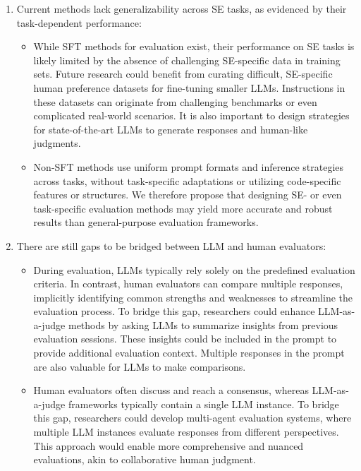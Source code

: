 \begin{enumerate}

    \item Current methods lack generalizability across SE tasks, as evidenced by their task-dependent performance:
    
    \begin{itemize}
    
        \item While SFT methods for evaluation exist, their performance on SE tasks is likely limited by the absence of challenging SE-specific data in training sets. Future research could benefit from curating difficult, SE-specific human preference datasets for fine-tuning smaller LLMs. Instructions in these datasets can originate from challenging benchmarks or even complicated real-world scenarios. It is also important to design strategies for state-of-the-art LLMs to generate responses and human-like judgments.

        \item Non-SFT methods use uniform prompt formats and inference strategies across tasks, without task-specific adaptations or utilizing code-specific features or structures. We therefore propose that designing SE- or even task-specific evaluation methods may yield more accurate and robust results than general-purpose evaluation frameworks.
        
    \end{itemize}

    \item There are still gaps to be bridged between LLM and human evaluators:

    \begin{itemize}
    
        \item During evaluation, LLMs typically rely solely on the predefined evaluation criteria. In contrast, human evaluators can compare multiple responses, implicitly identifying common strengths and weaknesses to streamline the evaluation process. To bridge this gap, researchers could enhance LLM-as-a-judge methods by asking LLMs to summarize insights from previous evaluation sessions. These insights could be included in the prompt to provide additional evaluation context. Multiple responses in the prompt are also valuable for LLMs to make comparisons.

        \item Human evaluators often discuss and reach a consensus, whereas LLM-as-a-judge frameworks typically contain a single LLM instance. To bridge this gap, researchers could develop multi-agent evaluation systems, where multiple LLM instances evaluate responses from different perspectives. This approach would enable more comprehensive and nuanced evaluations, akin to collaborative human judgment.


\end{itemize}
\end{enumerate}
